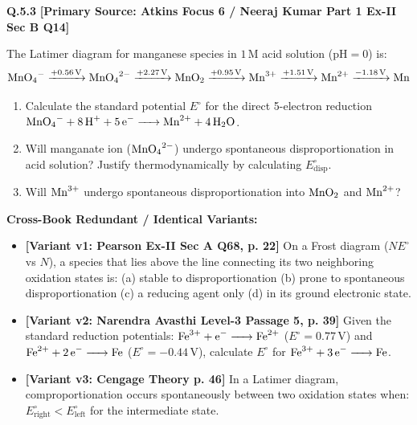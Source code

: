 \begin{problembox}
\textbf{Q.5.3} \hfill \textbf{[Primary Source: Atkins Focus 6 / Neeraj Kumar Part 1 Ex-II Sec B Q14]}
\label{q:qb-c5-03}

The Latimer diagram for manganese species in $1\,\text{M}$ acid solution ($\text{pH} = 0$) is:
\begin{equation*}
    \ce{MnO4^-} \xrightarrow{+0.56\,\text{V}} \ce{MnO4^2-} \xrightarrow{+2.27\,\text{V}} \ce{MnO2} \xrightarrow{+0.95\,\text{V}} \ce{Mn^3+} \xrightarrow{+1.51\,\text{V}} \ce{Mn^2+} \xrightarrow{-1.18\,\text{V}} \ce{Mn}
\end{equation*}
\begin{enumerate}[label=(\alph*)]
    \item Calculate the standard potential $E^\circ$ for the direct 5-electron reduction $\ce{MnO4^- + 8H+ + 5e^- -> Mn^2+ + 4H2O}$.
    \item Will manganate ion ($\ce{MnO4^2-}$) undergo spontaneous disproportionation in acid solution? Justify thermodynamically by calculating $E^\circ_{\text{disp}}$.
    \item Will $\ce{Mn^3+}$ undergo spontaneous disproportionation into $\ce{MnO2}$ and $\ce{Mn^2+}$?
\end{enumerate}

\tcbline
\textbf{\color{accentamber}Cross-Book Redundant / Identical Variants:}
\begin{itemize}[leftmargin=*,itemsep=2pt]
    \item \textbf{[Variant v1: Pearson Ex-II Sec A Q68, p. 22]} On a Frost diagram ($N E^\circ$ vs $N$), a species that lies above the line connecting its two neighboring oxidation states is: (a) stable to disproportionation (b) prone to spontaneous disproportionation (c) a reducing agent only (d) in its ground electronic state.
    \item \textbf{[Variant v2: Narendra Avasthi Level-3 Passage 5, p. 39]} Given the standard reduction potentials: $\ce{Fe^3+ + e^- -> Fe^2+}$ ($E^\circ = 0.77\,\text{V}$) and $\ce{Fe^2+ + 2e^- -> Fe}$ ($E^\circ = -0.44\,\text{V}$), calculate $E^\circ$ for $\ce{Fe^3+ + 3e^- -> Fe}$.
    \item \textbf{[Variant v3: Cengage Theory p. 46]} In a Latimer diagram, comproportionation occurs spontaneously between two oxidation states when: $E^\circ_{\text{right}} < E^\circ_{\text{left}}$ for the intermediate state.
\end{itemize}
\end{problembox}
